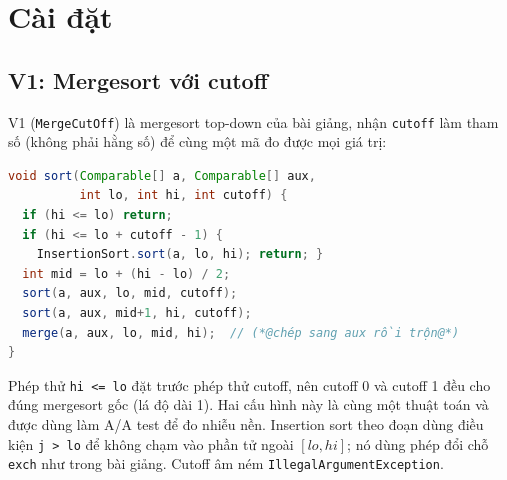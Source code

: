 \documentclass[11pt,a4paper]{article}
\begin{document}
\section{Cài đặt}\label{sec:impl}

\subsection{V1: Mergesort với cutoff}
V1 (\texttt{MergeCutOff}) là mergesort top-down của bài giảng, nhận \texttt{cutoff} làm tham số
(không phải hằng số) để cùng một mã đo được mọi giá trị:
\begin{lstlisting}[language=Java]
void sort(Comparable[] a, Comparable[] aux,
          int lo, int hi, int cutoff) {
  if (hi <= lo) return;
  if (hi <= lo + cutoff - 1) {
    InsertionSort.sort(a, lo, hi); return; }
  int mid = lo + (hi - lo) / 2;
  sort(a, aux, lo, mid, cutoff);
  sort(a, aux, mid+1, hi, cutoff);
  merge(a, aux, lo, mid, hi);  // (*@chép sang aux rồi trộn@*)
}
\end{lstlisting}
Phép thử \texttt{hi <= lo} đặt trước phép thử cutoff, nên cutoff 0 và cutoff 1 đều cho đúng mergesort
gốc (lá độ dài 1). Hai cấu hình này là cùng một thuật toán và được dùng làm A/A test để đo nhiễu nền.
Insertion sort theo đoạn dùng điều kiện \texttt{j > lo} để không chạm vào phần tử ngoài $[lo, hi]$;
nó dùng phép đổi chỗ \texttt{exch} như trong bài giảng. Cutoff âm ném \texttt{IllegalArgumentException}.
\end{document}
